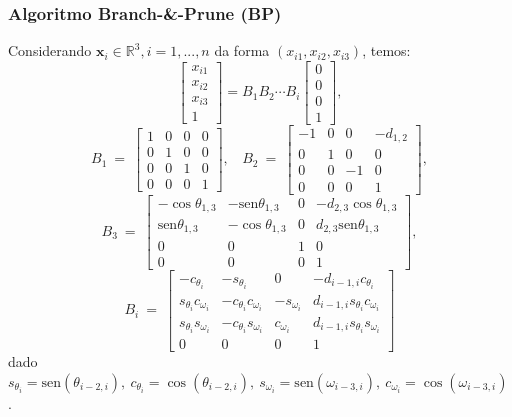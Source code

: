 \documentclass[10pt]{beamer}
\theoremstyle{plain}
\theoremstyle{definition}
\begin{document}
	\begin{frame}
		\frametitle{\normalsize Algoritmo Branch-\&-Prune (BP)} 
		{
			\small
			Considerando $\mathbf x_{i} \in\mathbb{R}^3,i= 1, ...,n $ da forma $(x_{i1},x_{i2},x_{i3})$, temos:
			$$
			\begin{bmatrix}
				x_{i1}\\ 
				x_{i2}\\ 
				x_{i3}\\ 
				1
			\end{bmatrix}
			= B_{1}B_{2}\cdots B_{i}\begin{bmatrix}
				0\\ 
				0\\ 
				0\\ 
				1
			\end{bmatrix},
			$$
			$$
			B_1\: =\:
			\begin{bmatrix}
				1 & 0 & 0 & 0\\ 
				0 & 1 & 0 & 0\\ 
				0 & 0 & 1 & 0\\ 
				0 & 0 & 0 & 1
			\end{bmatrix},\:\:\:
			\: B_2\: =\:
			\begin{bmatrix}
				-1 & 0 & 0 & -d_{1,2}\\
				0 & 1 & 0 & 0\\ 
				0 & 0 & -1 & 0\\ 
				0 & 0 & 0 & 1
			\end{bmatrix},
			$$
			$$
			B_3\:=\:
			\begin{bmatrix}
				-\cos\theta_{1,3} & -\mbox{sen}\theta_{1,3} & 0 & -d_{2,3}\cos\theta_{1,3}\\ 
				\mbox{sen}\theta_{1,3} & -\cos\theta_{1,3} & 0 & d_{2,3}\mbox{sen}\theta_{1,3}\\ 
				0 & 0 & 1 & 0\\ 
				0 & 0 & 0 & 1
			\end{bmatrix},
			$$
			$$
			B_i\:=\:
			\begin{bmatrix}
				-c_{\theta_{i}} & -s_{\theta_{i}} & 0 & -d_{i-1,i}c_{\theta_{i}}\\ 
				s_{\theta_{i}}c_{\omega_{i}} & -c_{\theta_{i}}c_{\omega_{i}}
				& -s_{\omega_{i}} & d_{i-1,i}s_{\theta_{i}}c_{\omega_{i}}\\ 
				s_{\theta_{i}}s_{\omega_{i}} & -c_{\theta_{i}}s_{\omega_{i}} & c_{\omega_{i}} & d_{i-1,i}s_{\theta_{i}}s_{\omega_{i}}\\ 
				0 & 0 & 0 & 1
			\end{bmatrix}
			$$
			dado $s_{\theta_{i}}=\mbox{sen} (\theta_{i-2, i}),\: c_{\theta_{i}}=\cos (\theta_{i-2, i}),\: s_{\omega_{i}}=\mbox{sen} (\omega_{i-3, i}),\: c_{\omega_{i}}=\cos (\omega_{i-3, i})$.
		}	
	\end{frame}
\end{document}
